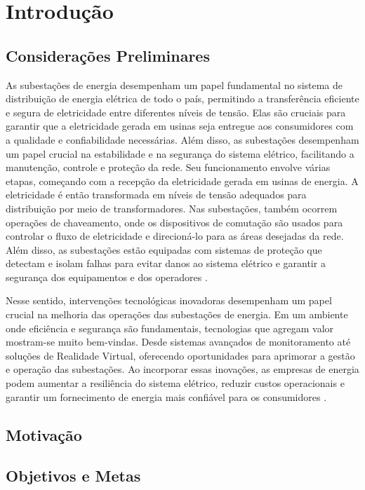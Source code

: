 \chapter{Introdução}

\section{Considerações Preliminares}

As subestações de energia desempenham um papel fundamental no sistema de distribuição de energia elétrica de todo o país, permitindo a transferência eficiente e segura de eletricidade entre diferentes níveis de tensão. Elas são cruciais para garantir que a eletricidade gerada em usinas seja entregue aos consumidores com a qualidade e confiabilidade necessárias. Além disso, as subestações desempenham um papel crucial na estabilidade e na segurança do sistema elétrico, facilitando a manutenção, controle e proteção da rede. Seu funcionamento envolve várias etapas, começando com a recepção da eletricidade gerada em usinas de energia. A eletricidade é então transformada em níveis de tensão adequados para distribuição por meio de transformadores. Nas subestações, também ocorrem operações de chaveamento, onde os dispositivos de comutação são usados para controlar o fluxo de eletricidade e direcioná-lo para as áreas desejadas da rede. Além disso, as subestações estão equipadas com sistemas de proteção que detectam e isolam falhas para evitar danos ao sistema elétrico e garantir a segurança dos equipamentos e dos operadores \cite{randolph2013electric}.

Nesse sentido, intervenções tecnológicas inovadoras desempenham um papel crucial na melhoria das operações das subestações de energia. Em um ambiente onde eficiência e segurança são fundamentais, tecnologias que agregam valor mostram-se muito bem-vindas. Desde sistemas avançados de monitoramento até soluções de Realidade Virtual, oferecendo oportunidades para aprimorar a gestão e operação das subestações. Ao incorporar essas inovações, as empresas de energia podem aumentar a resiliência do sistema elétrico, reduzir custos operacionais e garantir um fornecimento de energia mais confiável para os consumidores \cite{zhou2016big}.

\section{Motivação}
\label{sec:motivation}


\section{Objetivos e Metas}

